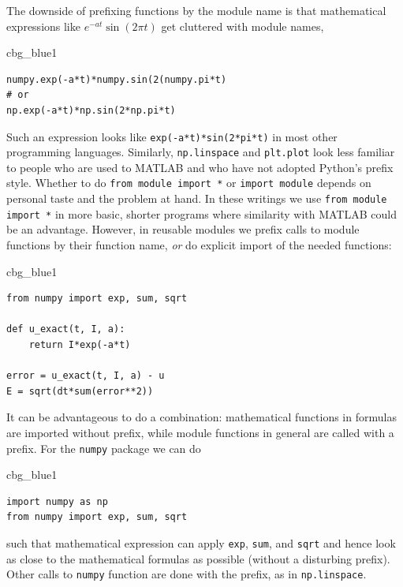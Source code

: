 \documentclass[%
oneside,                 %
final,                   %
10pt]{article}
\newenvironment{_cod_tight}[1]{
   \def\FrameCommand{\colorbox{#1}}
   \FrameRule0.6pt\MakeFramed {\FrameRestore}\vskip3mm}
   {\vskip0mm\endMakeFramed}
\newenvironment{cod}[1]{
\bgroup\rmfamily
\fboxsep=0mm\relax
\begin{_cod_tight}{#1}
\list{}{\parsep=-2mm\parskip=0mm\topsep=0pt\leftmargin=2mm
\rightmargin=2\leftmargin\leftmargin=4pt\relax}
\item\relax}
{\endlist\end{_cod_tight}\egroup}
\newenvironment{notice_mdfboxadmon}[1][]{
\begin{notice_mdfboxmdframed}[frametitle=#1]
}
{
\end{notice_mdfboxmdframed}
}
\begin{document}
The downside of prefixing functions by the module name is that
mathematical expressions like $e^{-at}\sin(2\pi t)$ get
cluttered with module names,
\begin{cod}{cbg_blue1}\begin{Verbatim}[numbers=none,fontsize=\fontsize{9pt}{9pt},baselinestretch=0.95,xleftmargin=2mm]
numpy.exp(-a*t)*numpy.sin(2(numpy.pi*t)
# or
np.exp(-a*t)*np.sin(2*np.pi*t)
\end{Verbatim}
\end{cod}
\noindent
Such an expression looks like \texttt{exp(-a*t)*sin(2*pi*t)} in most other
programming languages. Similarly, \texttt{np.linspace} and \texttt{plt.plot} look
less familiar to people who are used to MATLAB and who have not
adopted Python's prefix style.  Whether to do \texttt{from module import *}
or \texttt{import module} depends on personal taste and the problem at
hand. In these writings we use \texttt{from module import *} in more basic,
shorter programs where similarity with MATLAB could be an
advantage. However, in reusable modules we prefix calls to module
functions by their function name, \emph{or} do explicit import of the
needed functions:

\begin{cod}{cbg_blue1}\begin{Verbatim}[numbers=none,fontsize=\fontsize{9pt}{9pt},baselinestretch=0.95,xleftmargin=2mm]
from numpy import exp, sum, sqrt

def u_exact(t, I, a):
    return I*exp(-a*t)

error = u_exact(t, I, a) - u
E = sqrt(dt*sum(error**2))
\end{Verbatim}
\end{cod}
\noindent


\begin{notice_mdfboxadmon}
It can be advantageous to do a combination: mathematical functions
in formulas are imported without prefix, while module functions
in general are called with a prefix. For the \texttt{numpy} package we
can do

\begin{cod}{cbg_blue1}\begin{Verbatim}[numbers=none,fontsize=\fontsize{9pt}{9pt},baselinestretch=0.95,xleftmargin=2mm]
import numpy as np
from numpy import exp, sum, sqrt
\end{Verbatim}
\end{cod}
\noindent
such that mathematical expression can apply \texttt{exp}, \texttt{sum}, and \texttt{sqrt}
and hence look as close to the mathematical formulas as possible
(without a disturbing prefix).
Other calls to \texttt{numpy} function are done with the prefix, as in
\texttt{np.linspace}.
\end{notice_mdfboxadmon}
\end{document}
